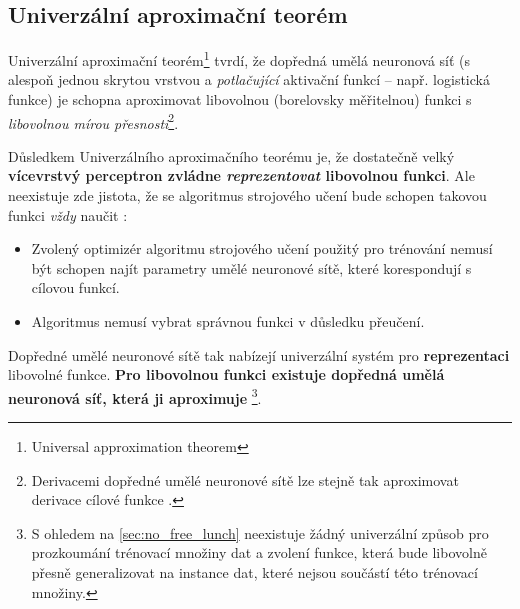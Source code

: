 \subsection{Univerzální aproximační teorém}
\label{sec:universal_approximation_theorem}
Univerzální aproximační teorém\footnote{Universal approximation theorem} \cite{Hornik1989, Cybenko1989} tvrdí, že dopředná umělá neuronová síť (s alespoň jednou skrytou vrstvou a \emph{potlačující} aktivační funkcí – např. logistická funkce) je schopna aproximovat libovolnou (borelovsky měřitelnou) funkci s \emph{libovolnou mírou přesnosti}\footnote{Derivacemi dopředné umělé neuronové sítě lze stejně tak aproximovat derivace cílové funkce \cite{Hornik1990}.}.

Důsledkem Univerzálního aproximačního teorému je, že dostatečně velký \textbf{vícevrstvý perceptron zvládne \emph{reprezentovat} libovolnou funkci}.
Ale neexistuje zde jistota, že se algoritmus strojového učení bude schopen takovou funkci \emph{vždy} naučit \cite{Goodfellow2016}:

\begin{itemize}
    \item Zvolený optimizér algoritmu strojového učení použitý pro trénování nemusí být schopen najít parametry umělé neuronové sítě, které korespondují s cílovou funkcí.
    \item Algoritmus nemusí vybrat správnou funkci v důsledku přeučení.
\end{itemize}

Dopředné umělé neuronové sítě tak nabízejí univerzální systém pro \textbf{reprezentaci} libovolné funkce. \textbf{Pro libovolnou funkci existuje dopředná umělá neuronová síť, která ji aproximuje}
\footnote{S ohledem na \autoref{sec:no_free_lunch} neexistuje žádný univerzální způsob pro prozkoumání trénovací množiny dat a zvolení funkce, která bude libovolně přesně generalizovat na instance dat, které nejsou součástí této trénovací množiny.}.